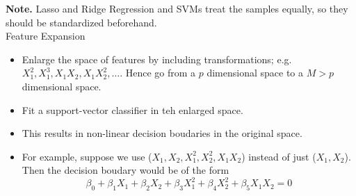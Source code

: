 \documentclass[11pt, a4paper]{article}
\begin{document}
\textbf{Note.} Lasso and Ridge Regression and SVMs treat the samples equally, so they should be standardized beforehand.\\[1mm]
Feature Expansion
\begin{itemize}
  \item Enlarge the space of features by including transformations; e.g. $X_1^2, X_1^3, X_1X_2, X_1X_2^2,\dots$. Hence go from a $p$ dimensional space to a $M>p$ dimensional space.
  \item Fit a support-vector classifier in teh enlarged space.
  \item This results in non-linear decision boudaries in the original space.
\item For example, suppose we use ($X_1,X_2,X_1^2,X_2^2,X_1 X_2$) instead of just ($X_1,X_2$). Then the decision boudary would be of the form
  \[
  \beta_0+ \beta_1 X_1+\beta_2 X_2+\beta_3 X_1^2+\beta_4 X_2^2+\beta_5 X_1 X_2=0
  \]
  \end{itemize}
\end{document}
